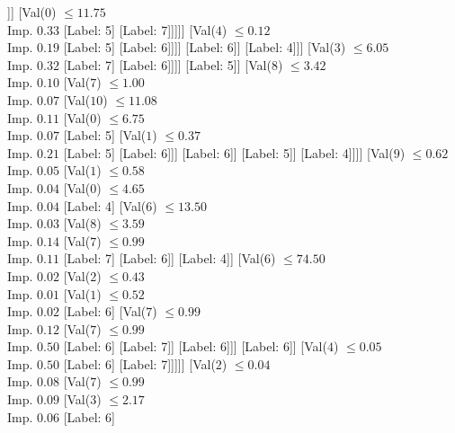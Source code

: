 \documentclass[margin=10pt]{standalone}
\begin{document}
\begin{forest}
																		[Label: 6]]]
																[Val($0$) $ \leq 11.75$ \\ Imp. $0.33$
																	[Label: 5]
																	[Label: 7]]]]]
													[Val($4$) $ \leq 0.12$ \\ Imp. $0.19$
														[Label: 5]
														[Label: 6]]]]
											[Label: 6]]
										[Label: 4]]]
								[Val($3$) $ \leq 6.05$ \\ Imp. $0.32$
									[Label: 7]
									[Label: 6]]]]
						[Label: 5]]
					[Val($8$) $ \leq 3.42$ \\ Imp. $0.10$
						[Val($7$) $ \leq 1.00$ \\ Imp. $0.07$
							[Val($10$) $ \leq 11.08$ \\ Imp. $0.11$
								[Val($0$) $ \leq 6.75$ \\ Imp. $0.07$
									[Label: 5]
									[Val($1$) $ \leq 0.37$ \\ Imp. $0.21$
										[Label: 5]
										[Label: 6]]]
								[Label: 6]]
							[Label: 5]]
						[Label: 4]]]]
			[Val($9$) $ \leq 0.62$ \\ Imp. $0.05$
				[Val($1$) $ \leq 0.58$ \\ Imp. $0.04$
					[Val($0$) $ \leq 4.65$ \\ Imp. $0.04$
						[Label: 4]
						[Val($6$) $ \leq 13.50$ \\ Imp. $0.03$
							[Val($8$) $ \leq 3.59$ \\ Imp. $0.14$
								[Val($7$) $ \leq 0.99$ \\ Imp. $0.11$
									[Label: 7]
									[Label: 6]]
								[Label: 4]]
							[Val($6$) $ \leq 74.50$ \\ Imp. $0.02$
								[Val($2$) $ \leq 0.43$ \\ Imp. $0.01$
									[Val($1$) $ \leq 0.52$ \\ Imp. $0.02$
										[Label: 6]
										[Val($7$) $ \leq 0.99$ \\ Imp. $0.12$
											[Val($7$) $ \leq 0.99$ \\ Imp. $0.50$
												[Label: 6]
												[Label: 7]]
											[Label: 6]]]
									[Label: 6]]
								[Val($4$) $ \leq 0.05$ \\ Imp. $0.50$
									[Label: 6]
									[Label: 7]]]]]
					[Val($2$) $ \leq 0.04$ \\ Imp. $0.08$
						[Val($7$) $ \leq 0.99$ \\ Imp. $0.09$
							[Val($3$) $ \leq 2.17$ \\ Imp. $0.06$
								[Label: 6]

\end{forest}
\end{document}
